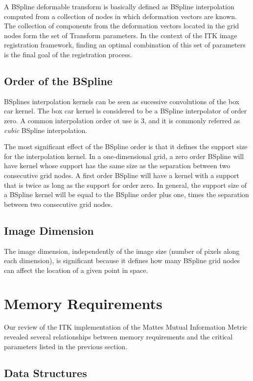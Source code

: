 \documentclass{InsightArticle}
\begin{document}
A BSpline deformable transform is basically defined as BSpline interpolation
computed from a collection of nodes in which deformation vectors are known.
The collection of components from the deformation vectors located in the grid
nodes form the set of Transform parameters. In the context of the ITK image
registration framework, finding an optimal combination of this set of
parameters is the final goal of the registration process.

\subsection{Order of the BSpline}

BSplines interpolation kernels can be seen as sucessive convolutions of the box
car kernel. The box car kernel is considered to be a BSpline interpolator of
order zero. A common interpolation order ot use is $3$, and it is commonly
referred as \emph{cubic} BSpline interpolation.

The most significant effect of the BSpline order is that it defines the support
size for the interpolation kernel. In a one-dimensional grid, a zero order
BSpline will have kernel whose support has the same size as the separation
between two consecutive grid nodes. A first order BSpline will have a kernel
with a support that is twice as long as the support for order zero. In general,
the support size of a BSpline kernel will be equal to the BSpline order plus
one, times the separation between two consecutive grid nodes.

\subsection{Image Dimension}

The image dimension, independently of the image size (number of pixels along
each dimension), is significant because it defines how many BSpline grid nodes
can affect the location of a given point in space.

\section{Memory Requirements}
\label{sec:MemoryRequirements}

Our review of the ITK implementation of the Mattes Mutual Information Metric
revealed several relationships between memory requirements and the critical
parameters listed in the previous section.

\subsection{Data Structures}
\end{document}
